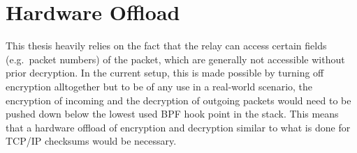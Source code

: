 \section{Hardware Offload}\label{sec:hardware_offload}
This thesis heavily relies on the fact that the relay can
access certain fields (e.g.~packet numbers) of the packet, 
which are generally not accessible without prior decryption.
In the current setup, this is made possible by turning off 
encryption alltogether but to be of any use in a real-world
scenario, the encryption of incoming and the decryption of
outgoing packets would need to be pushed down below the lowest 
used BPF hook point in the stack.
This means that a hardware offload of encryption and decryption
similar to what is done for TCP/IP checksums would be necessary.
